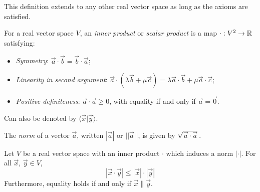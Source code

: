 \documentclass{../template/note}
\begin{document}
    This definition extends to any other real vector space as long as the axioms are satisfied.

    \begin{definition}
        For a real vector space \(V\), an \emph{inner product} or \emph{scalar product} is a map \(\cdot: V^2 \to \mathbb R\) satisfying:
        \begin{itemize}
            \item \emph{Symmetry}: \(\vec a \cdot \vec b = \vec b \cdot \vec a\);
            \item \emph{Linearity in second argument}: \(\vec a \cdot (\lambda \vec b + \mu \vec c) = \lambda \vec a \cdot \vec b + \mu \vec a \cdot \vec c\);
            \item \emph{Positive-definiteness}: \(\vec a \cdot \vec a \geq 0\), with equality if and only if \(\vec a = \vec 0\).
        \end{itemize}
        Can also be denoted by \(\langle \vec x | \vec y \rangle\).
        
    \end{definition}
    
    \begin{definition}
        The \emph{norm} of a vector \(\vec a\), written \(|\vec a|\) or \(||\vec a||\), is given by \(\sqrt{\vec a \cdot \vec a}\).
    \end{definition}


    \begin{theorem}
        Let \(V\) be a real vector space with an inner product \(\cdot\) which induces a norm \(|\cdot|\). For all \(\vec x\), \(\vec y \in V\),
        \[
            |\vec x \cdot \vec y| \leq |\vec x|\cdot|\vec y|
        \]
        Furthermore, equality holds if and only if \(\vec x \parallel \vec y\).
    \end{theorem}
    
\end{document}
